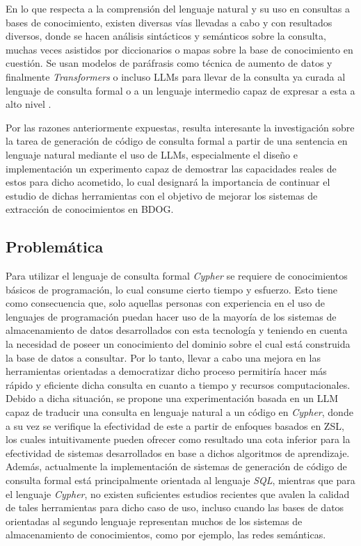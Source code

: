 En lo que respecta a la comprensión del lenguaje natural y su uso en consultas a bases de conocimiento, existen diversas vías llevadas a cabo y con resultados diversos, donde se hacen análisis sintácticos y semánticos sobre la consulta, muchas veces asistidos por diccionarios o mapas sobre la base de conocimiento en cuestión. Se usan modelos de paráfrasis como técnica de aumento de datos y finalmente \textit{Transformers} o incluso LLMs para llevar de la consulta ya curada al lenguaje de consulta formal o a un lenguaje intermedio capaz de expresar a esta a alto nivel \cite{text2sql1} \cite{text2cypher1}.

Por las razones anteriormente expuestas, resulta interesante la investigación sobre la tarea de generación de código de consulta formal a partir de una sentencia en lenguaje natural mediante el uso de LLMs, especialmente el diseño e implementación un experimento capaz de demostrar las capacidades reales de estos para dicho acometido, lo cual designará la importancia de continuar el estudio de dichas herramientas con el objetivo de mejorar los sistemas de extracción de conocimientos en BDOG.

\subsection*{Problemática}
Para utilizar el lenguaje de consulta formal \textit{Cypher} se requiere de conocimientos básicos de programación, lo cual consume cierto tiempo y esfuerzo. Esto tiene como consecuencia que, solo aquellas personas con experiencia en el uso de lenguajes de programación puedan hacer uso de la mayoría de los sistemas de almacenamiento de datos desarrollados con esta tecnología y teniendo en cuenta la necesidad de poseer un conocimiento del dominio sobre el cual está construida la base de datos a consultar. Por lo tanto, llevar a cabo una mejora en las herramientas orientadas a democratizar dicho proceso permitiría hacer más rápido y eficiente dicha consulta en cuanto a tiempo y recursos computacionales. Debido a dicha situación, se propone una experimentación basada en un LLM capaz de traducir una consulta en lenguaje natural a un código en \textit{Cypher}, donde a su vez se verifique la efectividad de este a partir de enfoques basados en ZSL, los cuales intuitivamente pueden ofrecer como resultado una cota inferior para la efectividad de sistemas desarrollados en base a dichos algoritmos de aprendizaje. Además, actualmente la implementación de sistemas de generación de código de consulta formal está principalmente orientada al lenguaje \textit{SQL}, mientras que para el lenguaje \textit{Cypher}, no existen suficientes estudios recientes que avalen la calidad de tales herramientas para dicho caso de uso, incluso cuando las bases de datos orientadas al segundo lenguaje representan muchos de los sistemas de almacenamiento de conocimientos, como por ejemplo, las redes semánticas.

